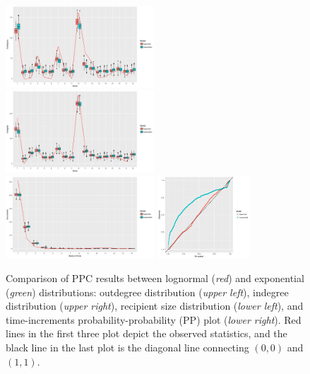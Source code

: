 \documentclass[ba]{imsart}
\numberwithin{equation}{section}
\theoremstyle{plain}
\begin{document}
	\fi
		\begin{figure}[H]
			\centering
			\includegraphics[width=0.495\textwidth]{img/outdegree_two-1.png}	
			\includegraphics[width=0.495\textwidth]{img/indegree_two-1.png}	
			\includegraphics[width=0.495\textwidth]{img/recipientsize_two-1.png}	
			\includegraphics[width=0.31\textwidth]{img/timepp_two-1.png}
			\caption {Comparison of PPC results between lognormal (\textit{red}) and exponential (\textit{green}) distributions: outdegree distribution (\textit{upper left}), indegree distribution (\textit{upper right}), recipient size distribution (\textit{lower left}), and time-increments probability-probability (PP) plot  (\textit{lower right}). Red lines in the first three plot depict the observed statistics, and the black line in the last plot is the diagonal line connecting $(0, 0)$ and $(1, 1)$.}
			\label{figure:PPCtwo}
		\end{figure}
		\newpage
\end{document}
